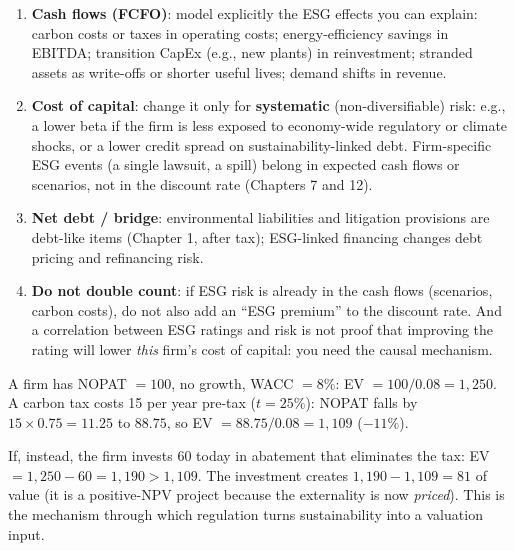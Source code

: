 \begin{addbox}
\begin{enumerate}[leftmargin=*]
  \item \textbf{Cash flows (FCFO)}: model explicitly the ESG effects you can explain: carbon costs or taxes in operating costs; energy-efficiency savings in EBITDA; transition CapEx (e.g., new plants) in reinvestment; stranded assets as write-offs or shorter useful lives; demand shifts in revenue.
  \item \textbf{Cost of capital}: change it only for \textbf{systematic} (non-diversifiable) risk: e.g., a lower beta if the firm is less exposed to economy-wide regulatory or climate shocks, or a lower credit spread on sustainability-linked debt. Firm-specific ESG events (a single lawsuit, a spill) belong in expected cash flows or scenarios, not in the discount rate (Chapters 7 and 12).
  \item \textbf{Net debt / bridge}: environmental liabilities and litigation provisions are debt-like items (Chapter 1, after tax); ESG-linked financing changes debt pricing and refinancing risk.
  \item \textbf{Do not double count}: if ESG risk is already in the cash flows (scenarios, carbon costs), do not also add an ``ESG premium'' to the discount rate. And a correlation between ESG ratings and risk is not proof that improving the rating will lower \emph{this} firm's cost of capital: you need the causal mechanism.
\end{enumerate}
\end{addbox}

\begin{exbox}
A firm has NOPAT $=100$, no growth, WACC $=8\%$: EV $=100/0.08=1{,}250$. A carbon tax costs 15 per year pre-tax ($t=25\%$): NOPAT falls by $15\times0.75=11.25$ to $88.75$, so EV $=88.75/0.08=1{,}109$ ($-11\%$).

If, instead, the firm invests 60 today in abatement that eliminates the tax: EV $=1{,}250-60=1{,}190>1{,}109$. The investment creates $1{,}190-1{,}109=81$ of value (it is a positive-NPV project because the externality is now \emph{priced}). This is the mechanism through which regulation turns sustainability into a valuation input.
\end{exbox}


